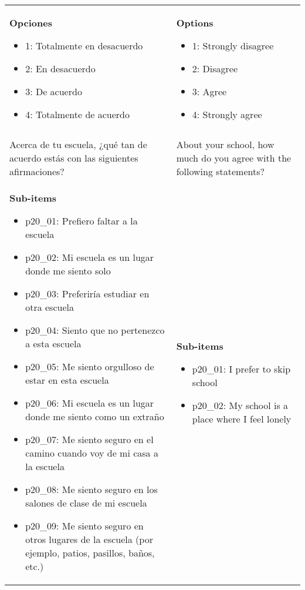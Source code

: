 \documentclass[11pt]{article}
\begin{document}
\begin{longtable}{@{}LL@{}}
\textbf{Opciones}\par\begin{itemize}[leftmargin=*]\item 1: Totalmente en desacuerdo
\item 2: En desacuerdo
\item 3: De acuerdo
\item 4: Totalmente de acuerdo\end{itemize} & \textbf{Options}\par\begin{itemize}[leftmargin=*]\item 1: Strongly disagree
\item 2: Disagree
\item 3: Agree
\item 4: Strongly agree\end{itemize} \\
\addlinespace[4pt]
 \\ 
Acerca de tu escuela, ¿qué tan de acuerdo estás con las siguientes afirmaciones? & About your school, how much do you agree with the following statements? \\
\textbf{Sub-items}\par\begin{itemize}[leftmargin=*]\item p20\_01: Prefiero faltar a la escuela
\item p20\_02: Mi escuela es un lugar donde me siento solo
\item p20\_03: Preferiría estudiar en otra escuela
\item p20\_04: Siento que no pertenezco a esta escuela
\item p20\_05: Me siento orgulloso de estar en esta escuela
\item p20\_06: Mi escuela es un lugar donde me siento como un extraño
\item p20\_07: Me siento seguro en el camino cuando voy de mi casa a la escuela
\item p20\_08: Me siento seguro en los salones de clase de mi escuela
\item p20\_09: Me siento seguro en otros lugares de la escuela (por ejemplo, patios, pasillos, baños, etc.)\end{itemize} & \textbf{Sub-items}\par\begin{itemize}[leftmargin=*]\item p20\_01: I prefer to skip school
\item p20\_02: My school is a place where I feel lonely

\end{itemize}
\end{longtable}
\end{document}
